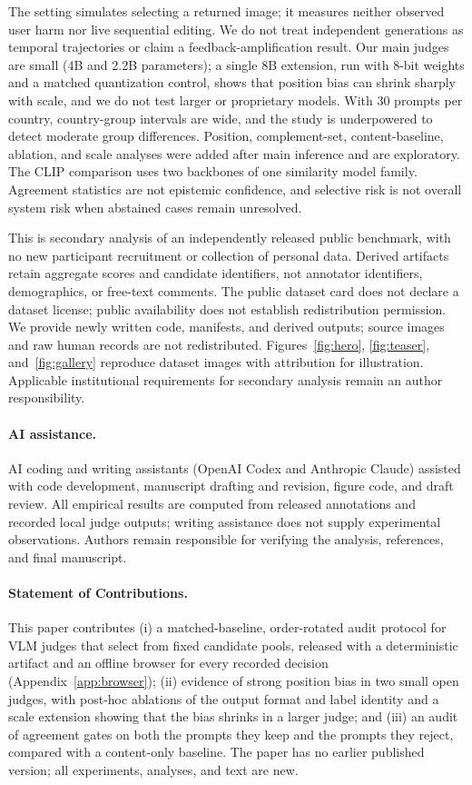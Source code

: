 \documentclass[letterpaper]{article}
\begin{document}
The setting simulates selecting a returned image; it measures neither observed user harm nor live sequential editing. We do not treat independent generations as temporal trajectories or claim a feedback-amplification result. Our main judges are small (4B and 2.2B parameters); a single 8B extension, run with 8-bit weights and a matched quantization control, shows that position bias can shrink sharply with scale, and we do not test larger or proprietary models. With 30 prompts per country, country-group intervals are wide, and the study is underpowered to detect moderate group differences. Position, complement-set, content-baseline, ablation, and scale analyses were added after main inference and are exploratory. The CLIP comparison uses two backbones of one similarity model family. Agreement statistics are not epistemic confidence, and selective risk is not overall system risk when abstained cases remain unresolved.

This is secondary analysis of an independently released public benchmark, with no new participant recruitment or collection of personal data. Derived artifacts retain aggregate scores and candidate identifiers, not annotator identifiers, demographics, or free-text comments. The public dataset card does not declare a dataset license; public availability does not establish redistribution permission. We provide newly written code, manifests, and derived outputs; source images and raw human records are not redistributed. Figures~\ref{fig:hero}, \ref{fig:teaser}, and~\ref{fig:gallery} reproduce dataset images with attribution for illustration. Applicable institutional requirements for secondary analysis remain an author responsibility.

\paragraph{AI assistance.}
AI coding and writing assistants (OpenAI Codex and Anthropic Claude) assisted with code development, manuscript drafting and revision, figure code, and draft review. All empirical results are computed from released annotations and recorded local judge outputs; writing assistance does not supply experimental observations. Authors remain responsible for verifying the analysis, references, and final manuscript.

\paragraph{Statement of Contributions.}
This paper contributes (i) a matched-baseline, order-rotated audit protocol for VLM judges that select from fixed candidate pools, released with a deterministic artifact and an offline browser for every recorded decision (Appendix~\ref{app:browser}); (ii) evidence of strong position bias in two small open judges, with post-hoc ablations of the output format and label identity and a scale extension showing that the bias shrinks in a larger judge; and (iii) an audit of agreement gates on both the prompts they keep and the prompts they reject, compared with a content-only baseline. The paper has no earlier published version; all experiments, analyses, and text are new.
\end{document}

